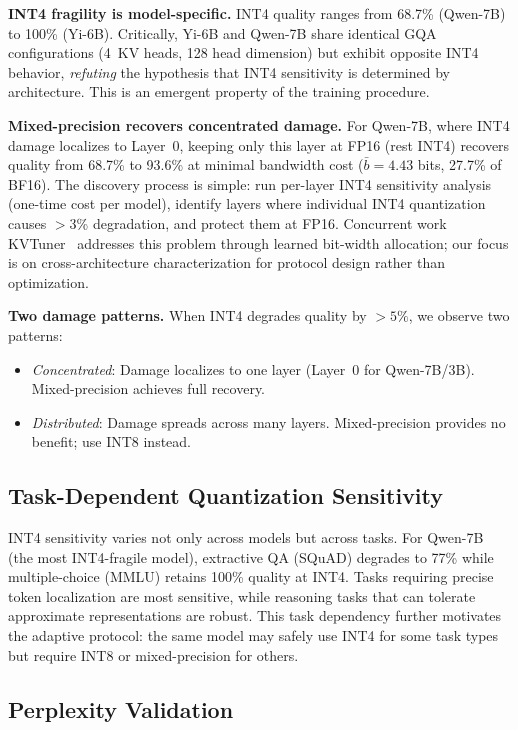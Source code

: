 \documentclass[journal]{IEEEtran}
\begin{document}
\textbf{INT4 fragility is model-specific.}
INT4 quality ranges from 68.7\% (Qwen-7B) to 100\% (Yi-6B).
Critically, Yi-6B and Qwen-7B share identical GQA configurations (4~KV heads, 128 head dimension) but exhibit opposite INT4 behavior, \emph{refuting} the hypothesis that INT4 sensitivity is determined by architecture.
This is an emergent property of the training procedure.

\textbf{Mixed-precision recovers concentrated damage.}
For Qwen-7B, where INT4 damage localizes to Layer~0, keeping only this layer at FP16 (rest INT4) recovers quality from 68.7\% to 93.6\% at minimal bandwidth cost ($\bar{b} = 4.43$ bits, 27.7\% of BF16).
The discovery process is simple: run per-layer INT4 sensitivity analysis (one-time cost per model), identify layers where individual INT4 quantization causes $>$3\% degradation, and protect them at FP16.
Concurrent work KVTuner~\cite{kvtuner} addresses this problem through learned bit-width allocation; our focus is on cross-architecture characterization for protocol design rather than optimization.

\textbf{Two damage patterns.}
When INT4 degrades quality by ${>}5\%$, we observe two patterns:
\begin{itemize}
    \item \emph{Concentrated}: Damage localizes to one layer (Layer~0 for Qwen-7B/3B). Mixed-precision achieves full recovery.
    \item \emph{Distributed}: Damage spreads across many layers. Mixed-precision provides no benefit; use INT8 instead.
\end{itemize}

\subsection{Task-Dependent Quantization Sensitivity}

INT4 sensitivity varies not only across models but across tasks.
For Qwen-7B (the most INT4-fragile model), extractive QA (SQuAD) degrades to 77\% while multiple-choice (MMLU) retains 100\% quality at INT4.
Tasks requiring precise token localization are most sensitive, while reasoning tasks that can tolerate approximate representations are robust.
This task dependency further motivates the adaptive protocol: the same model may safely use INT4 for some task types but require INT8 or mixed-precision for others.

\subsection{Perplexity Validation}
\end{document}

